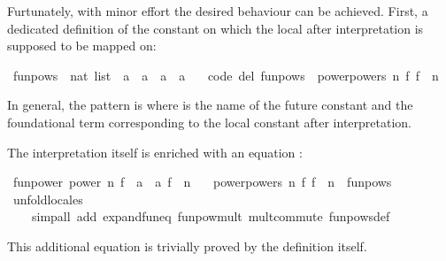 \begin{isabellebody}
\begin{isamarkuptext}
  Furtunately, with minor effort the desired behaviour can be achieved.
  First, a dedicated definition of the constant on which the local 
  after interpretation is supposed to be mapped on:%
\end{isamarkuptext}%
\isamarkuptrue%
%
\isadelimquote
%
\endisadelimquote
%
\isatagquote
{}\isamarkupfalse%
\ funpows\ {\isacharcolon}{\isacharcolon}\ {\isachardoublequoteopen}nat\ list\ {\isasymRightarrow}\ {\isacharparenleft}{\isacharprime}a\ {\isasymRightarrow}\ {\isacharprime}a{\isacharparenright}\ {\isasymRightarrow}\ {\isacharprime}a\ {\isasymRightarrow}\ {\isacharprime}a{\isachardoublequoteclose}\ \isanewline
\ \ {\isacharbrackleft}code\ del{\isacharbrackright}{\isacharcolon}\ {\isachardoublequoteopen}funpows\ {\isacharequal}\ power{\isachardot}powers\ {\isacharparenleft}{\isasymlambda}n\ f{\isachardot}\ f\ {\isacharcircum}{\isacharcircum}\ n{\isacharparenright}{\isachardoublequoteclose}%
\endisatagquote
{\isafoldquote}%
%
\isadelimquote
%
\endisadelimquote
%
\begin{isamarkuptext}%
\noindent In general, the pattern is  where  is
  the name of the future constant and  the foundational term
  corresponding to the local constant after interpretation.

  The interpretation itself is enriched with an equation :%
\end{isamarkuptext}%
\isamarkuptrue%
%
\isadelimquote
%
\endisadelimquote
%
\isatagquote
{}\isamarkupfalse%
\ fun{\isacharunderscore}power{\isacharcolon}\ power\ {\isachardoublequoteopen}{\isasymlambda}n\ {\isacharparenleft}f\ {\isacharcolon}{\isacharcolon}\ {\isacharprime}a\ {\isasymRightarrow}\ {\isacharprime}a{\isacharparenright}{\isachardot}\ f\ {\isacharcircum}{\isacharcircum}\ n{\isachardoublequoteclose}\ \isanewline
\ \ {\isachardoublequoteopen}power{\isachardot}powers\ {\isacharparenleft}{\isasymlambda}n\ f{\isachardot}\ f\ {\isacharcircum}{\isacharcircum}\ n{\isacharparenright}\ {\isacharequal}\ funpows{\isachardoublequoteclose}\isanewline
\ \ \isamarkupfalse%
\ unfold{\isacharunderscore}locales\isanewline
\ \ \ \ {\isacharparenleft}simp{\isacharunderscore}all\ add{\isacharcolon}\ expand{\isacharunderscore}fun{\isacharunderscore}eq\ funpow{\isacharunderscore}mult\ mult{\isacharunderscore}commute\ funpows{\isacharunderscore}def{\isacharparenright}%
\endisatagquote
{\isafoldquote}%
%
\isadelimquote
%
\endisadelimquote
%
\begin{isamarkuptext}%
\noindent This additional equation is trivially proved by the definition
  itself.


\end{isamarkuptext}
\end{isabellebody}
